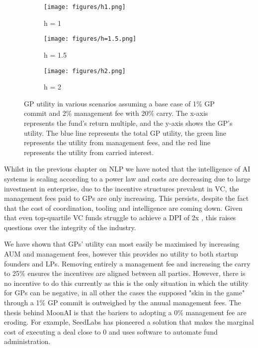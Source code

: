 \documentclass[a4paper, oneside]{discothesis}
\begin{document}
\begin{figure}[htbp]
    \centering
    \begin{subfigure}[b]{0.32\textwidth}
      \centering
      \texttt{[image: figures/h1.png]}
      \caption{h = 1}
      \label{fig:h1}
    \end{subfigure}
    \hfill
    \begin{subfigure}[b]{0.32\textwidth}
      \centering
      \texttt{[image: figures/h=1.5.png]}
      \caption{h = 1.5}
      \label{fig:h1.5}
    \end{subfigure}
    \hfill
    \begin{subfigure}[b]{0.32\textwidth}
      \centering
      \texttt{[image: figures/h2.png]}
      \caption{h = 2}
      \label{fig:h2}
    \end{subfigure}
    \caption{GP utility in various scenarios assuming a base case of 1\% GP commit and 2\% management fee with 20\% carry. The x-axis represents the fund's return multiple, and the y-axis shows the GP's utility. The blue line represents the total GP utility, the green line represents the utility from management fees, and the red line represents the utility from carried interest.}
    \label{fig:gp_utility_scenarios}
    \end{figure}

Whilst in the previous chapter on NLP we have noted that the intelligence of AI systems is scaling according to a power law and costs are decreasing due to large investment in enterprise, due to the incentive structures prevalent in VC, the management fees paid to GPs are only increasing. This persists, despite the fact that the cost of coordination, tooling and intelligence are coming down. Given that even top-quartile VC funds struggle to achieve a DPI of 2x \cite{gompers1994riseandfallofvc}, this raises questions over the integrity of the industry. 

We have shown that GPs' utility can most easily be maximised by increasing AUM and management fees, however this provides no utility to both startup founders and LPs. Removing entirely a management fee and increasing the carry to 25\% ensures the incentives are aligned between all parties. However, there is no incentive to do this currently as this is the only situation in which the utility for GPs can be negative, in all other the cases the supposed "skin in the game" through a 1\% GP commit is outweighed by the anuual management fees. The thesis behind MoonAI is that the bariers to adopting a 0\% management fee are eroding. For example, SeedLabs has pioneered a solution that makes the marginal cost of executing a deal close to 0 and uses software to automate fund administration. 
\end{document}

